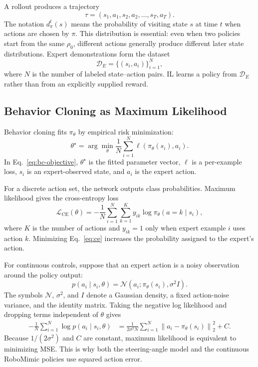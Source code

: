 \documentclass[10pt]{article}
\begin{document}
A rollout produces a trajectory
\[
  \tau=(s_1,a_1,s_2,a_2,\ldots,s_T,a_T).
\]
The notation $d_\pi^t(s)$ means the probability of visiting state $s$ at time
$t$ when actions are chosen by $\pi$. This distribution is essential: even when
two policies start from the same $\rho_0$, different actions generally produce
different later state distributions. Expert demonstrations form the dataset
\[
  \mathcal{D}_E=\{(s_i,a_i)\}_{i=1}^{N},
\]
where $N$ is the number of labeled state--action pairs. IL learns a policy from
$\mathcal{D}_E$ rather than from an explicitly supplied reward.

\subsection{Behavior Cloning as Maximum Likelihood}

Behavior cloning fits $\pi_\theta$ by empirical risk minimization:
\begin{equation}
  \theta^\star
  =\arg\min_\theta \frac{1}{N}
  \sum_{i=1}^{N}
  \ell\!\left(\pi_\theta(s_i),a_i\right).
  \label{eq:bc-objective}
\end{equation}
In Eq.~\eqref{eq:bc-objective}, $\theta^\star$ is the fitted parameter vector,
$\ell$ is a per-example loss, $s_i$ is an expert-observed state, and $a_i$ is
the expert action.

For a discrete action set, the network outputs class probabilities. Maximum
likelihood gives the cross-entropy loss
\begin{equation}
  \mathcal{L}_{\mathrm{CE}}(\theta)
  =-\frac{1}{N}\sum_{i=1}^{N}
  \sum_{k=1}^{K}y_{ik}\log \pi_\theta(a=k\mid s_i),
  \label{eq:ce}
\end{equation}
where $K$ is the number of actions and $y_{ik}=1$ only when expert example $i$
uses action $k$. Minimizing Eq.~\eqref{eq:ce} increases the probability assigned
to the expert's action.

For continuous controls, suppose that an expert action is a noisy observation
around the policy output:
\[
  p(a_i\mid s_i,\theta)
  =\mathcal{N}\!\left(a_i;\pi_\theta(s_i),\sigma^2 I\right).
\]
The symbols $\mathcal{N}$, $\sigma^2$, and $I$ denote a Gaussian density, a
fixed action-noise variance, and the identity matrix. Taking the negative log
likelihood and dropping terms independent of $\theta$ gives
\begin{align}
  -\frac{1}{N}\sum_{i=1}^{N}\log p(a_i\mid s_i,\theta)
  &=
  \frac{1}{2\sigma^2N}
  \sum_{i=1}^{N}
  \left\|a_i-\pi_\theta(s_i)\right\|_2^2+C.
  \label{eq:mse-derivation}
\end{align}
Because $1/(2\sigma^2)$ and $C$ are constant, maximum likelihood is equivalent
to minimizing MSE. This is why both the steering-angle model and the continuous
RoboMimic policies use squared action error.
\end{document}
